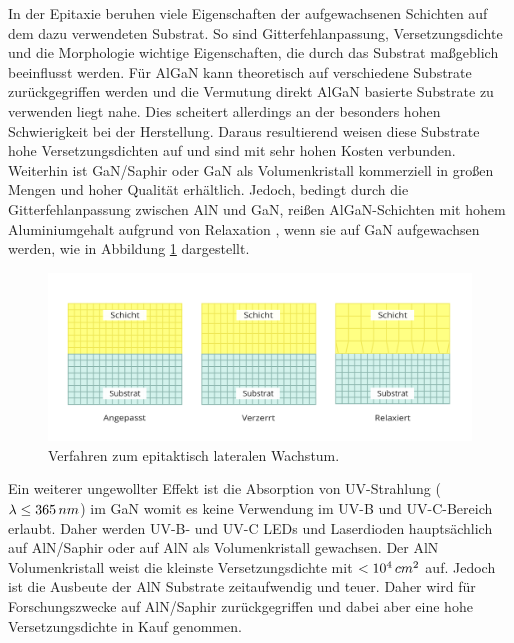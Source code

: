In der Epitaxie beruhen viele Eigenschaften der aufgewachsenen Schichten auf dem dazu verwendeten Substrat. So sind Gitterfehlanpassung, Versetzungsdichte und die Morphologie wichtige Eigenschaften, die durch das Substrat maßgeblich beeinflusst werden. Für AlGaN kann theoretisch auf verschiedene Substrate zurückgegriffen werden und die Vermutung direkt AlGaN basierte Substrate zu verwenden liegt nahe. Dies scheitert allerdings an der besonders hohen Schwierigkeit bei der Herstellung.
\newline
Daraus resultierend weisen diese Substrate hohe Versetzungsdichten auf und sind mit sehr hohen Kosten verbunden. Weiterhin ist GaN/Saphir oder GaN als Volumenkristall kommerziell in großen Mengen und hoher Qualität erhältlich. Jedoch, bedingt durch die  Gitterfehlanpassung zwischen AlN und GaN, reißen AlGaN-Schichten mit hohem Aluminiumgehalt aufgrund von Relaxation \cite{problem}, wenn sie auf GaN aufgewachsen werden, wie in Abbildung \ref{fig:wachstum} dargestellt.
\begin{figure}[h]
    \centering
    \begin{minipage}[t]{1\linewidth}
    \centering
    \includegraphics[width=1\linewidth]{Bilder/wachstumsarten.png}
    \end{minipage}%
    \caption{Verfahren zum epitaktisch lateralen Wachstum.}
     \label{fig:wachstum}
\end{figure} 
Ein weiterer ungewollter Effekt ist die Absorption von UV-Strahlung ($\lambda \leq 365 \thinspace nm$) im GaN womit es keine Verwendung im UV-B und UV-C-Bereich erlaubt. Daher werden UV-B- und UV-C LEDs und Laserdioden hauptsächlich auf AlN/Saphir oder auf AlN als Volumenkristall gewachsen. Der AlN Volumenkristall weist die kleinste Versetzungsdichte mit $<10^4 \thinspace cm^2$ auf. Jedoch ist die Ausbeute der AlN Substrate zeitaufwendig und teuer. Daher wird für Forschungszwecke auf AlN/Saphir zurückgegriffen und dabei aber eine hohe Versetzungsdichte in Kauf genommen. 
\newline
